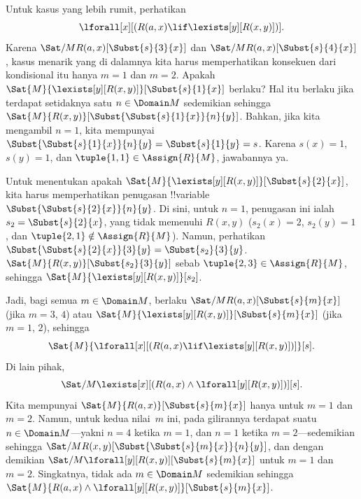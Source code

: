 \documentclass[../../../include/open-logic-section]{subfiles}
\begin{document}
\begin{ex}

Untuk kasus yang lebih rumit, perhatikan
\[
\lforall[x][(R(a,x) \lif \lexists[y][R(x,y)])].
\]
Karena $\Sat/{M}{R(a,x)}[\Subst{s}{3}{x}]$ dan
$\Sat/{M}{R(a,x)}[\Subst{s}{4}{x}]$, kasus menarik yang di dalamnya kita
harus memperhatikan konsekuen dari kondisional itu hanya $m = 1$ dan
$m = 2$. Apakah $\Sat{M}{\lexists[y][R(x,y)]}[\Subst{s}{1}{x}]$ berlaku?
Hal itu berlaku jika terdapat setidaknya satu $n \in \Domain M$ sedemikian
sehingga $\Sat{M}{R(x,y)}[\Subst{\Subst{s}{1}{x}}{n}{y}]$. Bahkan, jika
kita mengambil $n = 1$, kita mempunyai
$\Subst{\Subst{s}{1}{x}}{n}{y} = \Subst{s}{1}{y} = s$. Karena
$s(x) = 1$, $s(y) = 1$, dan $\tuple{1,1} \in \Assign{R}{M}$, jawabannya ya.

Untuk menentukan apakah $\Sat{M}{\lexists[y][R(x,y)]}[\Subst{s}{2}{x}]$,
kita harus memperhatikan penugasan !!{variable}
$\Subst{\Subst{s}{2}{x}}{n}{y}$. Di sini, untuk $n = 1$, penugasan ini
ialah~$s_2 = \Subst{s}{2}{x}$, yang tidak memenuhi $R(x,y)$ ($s_2(x) = 2$,
$s_2(y) = 1$, dan $\tuple{2,1}\notin \Assign{R}{M}$). Namun, perhatikan
$\Subst{\Subst{s}{2}{x}}{3}{y} = \Subst{s_2}{3}{y}$.
$\Sat{M}{R(x,y)}[\Subst{s_2}{3}{y}]$ sebab $\tuple{2,3} \in
\Assign{R}{M}$, sehingga $\Sat{M}{\lexists[y][R(x,y)]}[s_2]$.

Jadi, bagi semua $m \in \Domain M$, berlaku
$\Sat/{M}{R(a,x)}[\Subst{s}{m}{x}]$ (jika $m = 3$, $4$) atau
$\Sat{M}{\lexists[y][R(x,y)]}[\Subst{s}{m}{x}]$ (jika $m = 1$, $2$),
sehingga
\[
\Sat{M}{\lforall[x][(R(a,x) \lif \lexists[y][R(x,y)])]}[s].
\]
Di lain pihak,
\[
\Sat/{M}{\lexists[x][(R(a,x) \land \lforall[y][R(x,y)])]}[s].
\]
Kita mempunyai $\Sat{M}{R(a,x)}[\Subst{s}{m}{x}]$ hanya untuk $m = 1$ dan
$m = 2$. Namun, untuk kedua nilai~$m$ ini, pada gilirannya terdapat suatu
$n \in \Domain M$---yakni $n = 4$ ketika $m = 1$, dan $n = 1$ ketika
$m = 2$---sedemikian sehingga
$\Sat/{M}{R(x,y)}[\Subst{\Subst{s}{m}{x}}{n}{y}]$, dan dengan demikian
$\Sat/{M}{\lforall[y][R(x,y)]}[\Subst{s}{m}{x}]$ untuk $m = 1$ dan
$m = 2$. Singkatnya, tidak ada $m \in \Domain M$ sedemikian sehingga
$\Sat{M}{R(a,x) \land \lforall[y][R(x,y)]}[\Subst{s}{m}{x}]$.
\end{ex}
\end{document}
